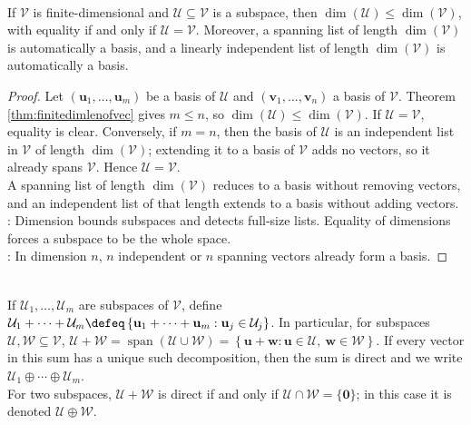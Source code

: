 \begin{proposition} \label{prop:dimension-bounds-and-basis-criteria} \\
If $\mathcal{V}$ is finite-dimensional and $\mathcal{U} \subseteq \mathcal{V}$ is a subspace, then $\dim(\mathcal{U}) \leq \dim(\mathcal{V})$, with equality if and only if $\mathcal{U}=\mathcal{V}$. Moreover, a spanning list of length $\dim(\mathcal{V})$ is automatically a basis, and a linearly independent list of length $\dim(\mathcal{V})$ is automatically a basis.
\begin{proof}
Let $(\mathbf{u}_1,\ldots,\mathbf{u}_m)$ be a basis of $\mathcal{U}$ and $(\mathbf{v}_1,\ldots,\mathbf{v}_n)$ a basis of $\mathcal{V}$. Theorem \ref{thm:finitedimlenofvec} gives $m\leq n$, so $\dim(\mathcal{U})\leq\dim(\mathcal{V})$. If $\mathcal{U}=\mathcal{V}$, equality is clear. Conversely, if $m=n$, then the basis of $\mathcal{U}$ is an independent list in $\mathcal{V}$ of length $\dim(\mathcal{V})$; extending it to a basis of $\mathcal{V}$ adds no vectors, so it already spans $\mathcal{V}$. Hence $\mathcal{U}=\mathcal{V}$.\\
A spanning list of length $\dim(\mathcal{V})$ reduces to a basis without removing vectors, and an independent list of that length extends to a basis without adding vectors.\\
: Dimension bounds subspaces and detects full-size lists. Equality of dimensions forces a subspace to be the whole space.\\
: In dimension $n$, $n$ independent or $n$ spanning vectors already form a basis.
\end{proof}
\end{proposition}

\begin{definition} \\
If $\mathcal{U}_1, \ldots, \mathcal{U}_m$ are subspaces of $\mathcal{V}$, define $\mathcal{U}_1 + \cdots + \mathcal{U}_m \defeq \left\{ \mathbf{u}_1 + \cdots + \mathbf{u}_m : \mathbf{u}_j \in \mathcal{U}_j \right\}$.
In particular, for subspaces $\mathcal{U},\mathcal{W}\subseteq\mathcal{V}$, $\mathcal{U}+\mathcal{W} = \operatorname{span}(\mathcal{U}\cup\mathcal{W}) = \left\{ \mathbf{u}+\mathbf{w} : \mathbf{u}\in\mathcal{U},\ \mathbf{w}\in\mathcal{W} \right\}$.
If every vector in this sum has a unique such decomposition, then the sum is direct and we write $\mathcal{U}_1 \oplus \cdots \oplus \mathcal{U}_m$.\\
For two subspaces, $\mathcal{U}+\mathcal{W}$ is direct if and only if $\mathcal{U}\cap\mathcal{W}=\{\mathbf{0}\}$; in this case it is denoted $\mathcal{U}\oplus\mathcal{W}$.
\end{definition}

